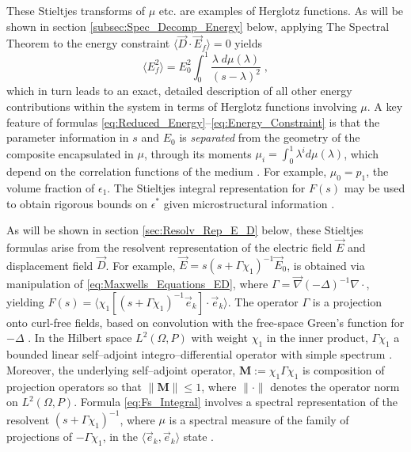\documentclass[english,12pt]{ttuthes}
\begin{document}
These Stieltjes transforms of $\mu$ etc. are examples of
Herglotz functions. As will be shown in section
\ref{subsec:Spec_Decomp_Energy} below, applying The Spectral Theorem
\cite{Reed-1980} to the energy constraint  $\langle\vec{D}\cdot\vec{E}_f \rangle=0$
yields 
% 
\begin{equation} \label{eq:Energy_Constraint}
	\langle E_f^2\rangle=E_0^2\int_0^1\frac{\lambda \; d\mu(\lambda)}{(s-\lambda)^2}\;, 
\end{equation}
% 
which in turn leads to an exact, detailed description of all other
energy contributions within the system in terms of Herglotz functions
involving $\mu$. A key feature of formulas
\eqref{eq:Reduced_Energy}--\eqref{eq:Energy_Constraint}
is that the parameter information in $s$ 
and $E_0$ is {\it separated} from the geometry of the composite
encapsulated in $\mu$, through its moments $\mu_i=\int_0^1 \lambda^i d\mu(\lambda)$, which
depend on the correlation functions of the medium
\cite{Golden:CMP-473}. For example, $\mu_0=p_1$, the volume fraction of
$\epsilon_1$. The Stieltjes integral representation for $F(s)$ may be used to
obtain rigorous bounds on $\epsilon^*$ given microstructural information 
\cite{Bergman:PRL-1285,Milton:APL-300,Golden:CMP-473,Bergman:AP-78}. 

As will be shown in section \ref{sec:Resolv_Rep_E_D} below, these
Stieltjes formulas arise from the resolvent representation of the
electric field $\vec{E}$ and displacement field $\vec{D}$. For
example, $\vec{E} = s(s + \Gamma \chi_1)^{-1}\vec{E}_0$, is obtained via
manipulation of \eqref{eq:Maxwells_Equations_ED}, where $\Gamma=\vec{\nabla}(-\Delta)^{-1}\nabla\cdot$,
yielding $F(s)=\langle\chi_1[(s+\Gamma\chi_1)^{-1}\vec{e}_k]\cdot\vec{e}_k \rangle$. The operator
$\Gamma$ is a projection onto curl-free fields, based on convolution with
the free-space Green's function for $-\Delta$ \cite{Golden:CMP-473}. In the
Hilbert space $L^2(\Omega,P)$ with weight $\chi_1$ in the inner product,
$\Gamma\chi_1$ a bounded linear self--adjoint integro--differential operator
with simple spectrum \cite{Golden:CMP-473}. Moreover, the
underlying self--adjoint operator, $\mathbf{M}:=\chi_1\Gamma\chi_1$ is
composition of projection operators so that $\|\mathbf{M}\|\leq1$, where
$\|\cdot\|$ denotes the operator norm on $L^2(\Omega,P)$. Formula
\eqref{eq:Fs_Integral} involves a spectral representation of the
resolvent $(s+\Gamma\chi_1)^{-1}$, where $\mu$ is a spectral measure of the
family of projections of $-\Gamma\chi_1$, in the $\langle\vec{e}_k,\vec{e}_k\rangle$ state
\cite{Golden:CMP-473,Reed-1980}.       
%
\end{document}
